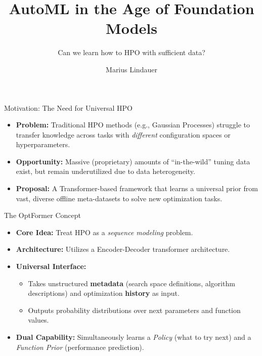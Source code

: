 \documentclass[main]{subfiles}
\title[AutoML in the Age of Foundation Models]{AutoML in the Age of Foundation Models}
\subtitle{Can we learn how to HPO with sufficient data?}
\author[Marius Lindauer]{Marius Lindauer}
\date{}
\begin{document}
	
	\maketitle
	

\begin{frame}{Motivation: The Need for Universal HPO}
    \begin{itemize}
        \item \textbf{Problem:} Traditional HPO methods (e.g., Gaussian Processes) struggle to transfer knowledge across tasks with \textit{different} configuration spaces or hyperparameters.
        \item \textbf{Opportunity:} Massive (proprietary) amounts of ``in-the-wild'' tuning data exist, but remain underutilized due to data heterogeneity.
        \item \textbf{Proposal:} A Transformer-based framework that learns a universal prior from vast, diverse offline meta-datasets to solve new optimization tasks.
    \end{itemize}
\end{frame}

\begin{frame}{The OptFormer Concept }
    \begin{itemize}
        \item \textbf{Core Idea:} Treat HPO as a \textit{sequence modeling} problem.
        \item \textbf{Architecture:} Utilizes a Encoder-Decoder transformer architecture.
        \item \textbf{Universal Interface:} 
            \begin{itemize}
                \item Takes unstructured \textbf{metadata} (search space definitions, algorithm descriptions) and optimization \textbf{history} as input.
                \item Outputs probability distributions over next parameters and function values.
            \end{itemize}
        \item \textbf{Dual Capability:} Simultaneously learns a \textit{Policy} (what to try next) and a \textit{Function Prior} (performance prediction).
    \end{itemize}
\end{frame}
\end{document}
